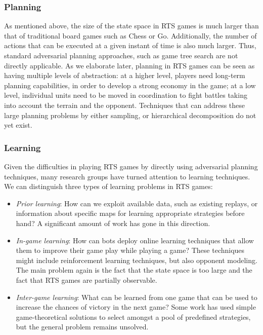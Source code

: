 \documentclass[journal]{IEEEtran}
\begin{document}
\subsubsection{Planning}
As mentioned above, the size of the state space in RTS games is much larger than that of traditional board games such as Chess or Go. Additionally, the number of actions that can be executed at a given instant of time is also much larger. Thus, standard adversarial planning approaches, such as game tree search are not directly applicable. As we elaborate later, planning in RTS games can be seen as having multiple levels of abstraction: at a higher level, players need long-term planning capabilities, in order to develop a strong economy in the game; at a low level, individual units need to be moved in coordination to fight battles taking into account the terrain and the opponent. Techniques that can address these large planning problems by either sampling, or hierarchical decomposition do not yet exist.

\subsubsection{Learning}
Given the difficulties in playing RTS games by directly using adversarial planning techniques, many research groups have turned attention to learning techniques. We can distinguish three types of learning problems in RTS games:
\begin{itemize}
\item {\em Prior learning}: How can we exploit available data, such as existing replays, or information about specific maps for learning appropriate strategies before hand? A significant amount of work has gone in this direction.%
\item {\em In-game learning}: How can bots deploy online learning techniques that allow them to improve their game play while playing a game? These techniques might include reinforcement learning techniques, but also opponent modeling. The main problem again is the fact that the state space is too large and the fact that RTS games are partially observable.
\item {\em Inter-game learning}: What can be learned from one game that can be used to increase the chances of victory in the next game? Some work has used simple game-theoretical solutions to select amongst a pool of predefined strategies, but the general problem remains unsolved.
\end{itemize}
\end{document}
